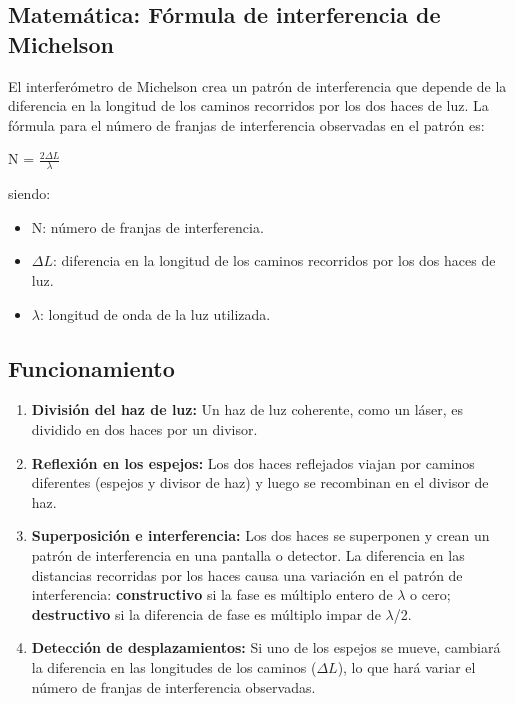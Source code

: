 \documentclass[a4paper, 12pt]{article}
\begin{document}
	\subsection{Matemática: Fórmula de interferencia de Michelson}
	
	El interferómetro de Michelson crea un patrón de interferencia que depende de la diferencia en la longitud de los caminos recorridos por los dos haces de luz. La fórmula para el número de franjas de interferencia observadas en el patrón es:
	
		\begin{center}
			N = $\frac{2 \Delta L}{\lambda}$ \\
		\end{center}
		
	siendo:
		\begin{itemize}
			\item N: número de franjas de interferencia.
			\item $\Delta L$: diferencia en la longitud de los caminos recorridos por los dos haces de luz.
			\item $\lambda$: longitud de onda de la luz utilizada.
		\end{itemize}
		
	\subsection{Funcionamiento}
		\begin{enumerate}
			\item \textbf{División del haz de luz:} Un haz de luz coherente, como un láser, es dividido en dos haces por un divisor.
			
			\item \textbf{Reflexión en los espejos:} Los dos haces reflejados viajan por caminos diferentes (espejos y divisor de haz) y luego se recombinan en el divisor de haz.
			
			\item \textbf{Superposición e interferencia:} Los dos haces se superponen y crean un patrón de interferencia en una pantalla o detector. La diferencia en las distancias recorridas por los haces causa una variación en el patrón de interferencia: \textbf{constructivo} si la fase es múltiplo entero de $\lambda$ o cero; \textbf{destructivo} si la diferencia de fase es múltiplo impar de $\lambda$/2.
			
			\item \textbf{Detección de desplazamientos:} Si uno de los espejos se mueve, cambiará la diferencia en las longitudes de los caminos ($\Delta L$), lo que hará variar el número de franjas de interferencia observadas. 
		\end{enumerate}
		
\end{document}
